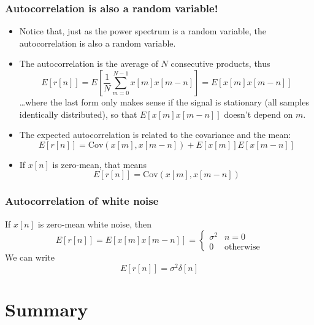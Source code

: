 \documentclass{beamer}
\begin{document}
\begin{frame}
  \frametitle{Autocorrelation is also a random variable!}

  \begin{itemize}
    \item Notice that, just as the power spectrum is a random
      variable, the autocorrelation is also a random variable.
    \item The autocorrelation is the average of $N$ consecutive
      products, thus
      \[
      E\left[r[n]\right] =
      E\left[\frac{1}{N}\sum_{m=0}^{N-1} x[m]x[m-n]\right]
      = E\left[x[m]x[m-n]\right]
      \]
      \ldots where the last form only makes sense if the signal is
      stationary (all samples identically distributed), so that
      $E\left[x[m]x[m-n]\right]$ doesn't depend on $m$.
    \item
      The expected autocorrelation is related to the covariance
      and the mean:
      \[
      E\left[r[n]\right] =\mbox{Cov}\left(x[m],x[m-n]\right)+E\left[x[m]\right]E\left[x[m-n]\right]
      \]
    \item
      If $x[n]$ is zero-mean, that means
      \[
      E\left[r[n]\right] =\mbox{Cov}\left(x[m],x[m-n]\right)
      \]
  \end{itemize}
\end{frame}
\begin{frame}
  \frametitle{Autocorrelation of white noise}
  If $x[n]$ is zero-mean white noise, then
  \[
  E\left[r[n]\right] =
  E\left[x[m]x[m-n]\right]= \begin{cases} \sigma^2 & n=0\\0 &\mbox{otherwise}\end{cases}
  \]
  We can write
  \[
  E\left[r[n]\right]=\sigma^2\delta[n]
  \]
\end{frame}

\section[Summary]{Summary}
\setcounter{subsection}{1}
\end{document}
